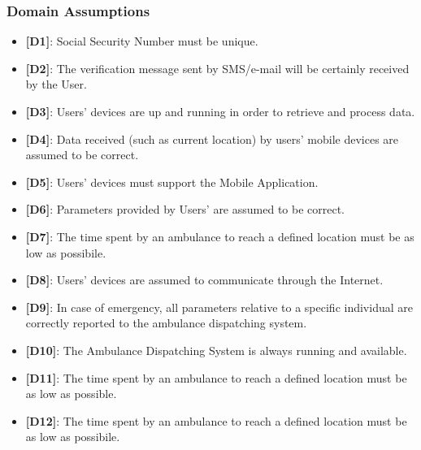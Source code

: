 \documentclass[12pt,a4paper]{article}
\begin{document}
		\subsubsection{Domain Assumptions}
			\begin{itemize} 
				\item {\textbf[}\textbf{D1}{\textbf]}: Social Security Number must be unique.
				\item {\textbf[}\textbf{D2}{\textbf]}: The verification message sent by SMS/e-mail will be certainly received by the User.
				\item {\textbf[}\textbf{D3}{\textbf]}: Users' devices are up and running in order to retrieve and process data. 
				\item {\textbf[}\textbf{D4}{\textbf]}: Data received (such as current location) by users' mobile devices are assumed to be correct.
				\item {\textbf[}\textbf{D5}{\textbf]}: Users' devices must support the Mobile Application.
				\item {\textbf[}\textbf{D6}{\textbf]}: Parameters provided by Users' are assumed to be correct.
				\item {\textbf[}\textbf{D7}{\textbf]}: The time spent by an ambulance to reach a defined location must be as low as possibile.
				\item {\textbf[}\textbf{D8}{\textbf]}: Users' devices are assumed to communicate through the Internet.
				\item {\textbf[}\textbf{D9}{\textbf]}: In case of emergency, all parameters relative to a specific individual are correctly reported to the ambulance dispatching system.
				\item {\textbf[}\textbf{D10}{\textbf]}: The Ambulance Dispatching System is always running and available.
				\item {\textbf[}\textbf{D11}{\textbf]}: The time spent by an ambulance to reach a defined location must be as low as possible.
				\item {\textbf[}\textbf{D12}{\textbf]}: The time spent by an ambulance to reach a defined location must be as low as possibile.
			\end{itemize}
\end{document}
